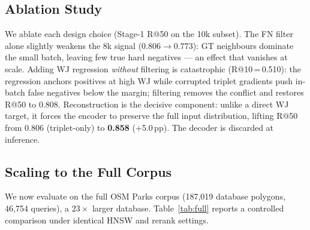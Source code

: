 \documentclass[sigconf]{acmart}
\begin{document}
\subsection{Ablation Study}
\label{sec:ablation}

We ablate each design choice (Stage-1 R@50 on the 10k subset). The FN filter
alone slightly weakens the 8k signal ($0.806\!\to\!0.773$): GT neighbours
dominate the small batch, leaving few true hard negatives --- an effect that
vanishes at scale. Adding WJ regression \emph{without} filtering is catastrophic
(R@10\,=\,0.510): the regression anchors positives at high WJ while corrupted
triplet gradients push in-batch false negatives below the margin; filtering
removes the conflict and restores R@50 to 0.808. Reconstruction is the decisive
component: unlike a direct WJ target, it forces the encoder to preserve the full
input distribution, lifting R@50 from 0.806 (triplet-only) to \textbf{0.858}
(+5.0\,pp). The decoder is discarded at inference.

\subsection{Scaling to the Full Corpus}
\label{sec:fullscale}

We now evaluate on the full OSM Parks corpus (187{,}019 database polygons,
46{,}754 queries), a $23\times$ larger database. Table~\ref{tab:full} reports a
controlled comparison under identical HNSW and rerank settings.
\end{document}
